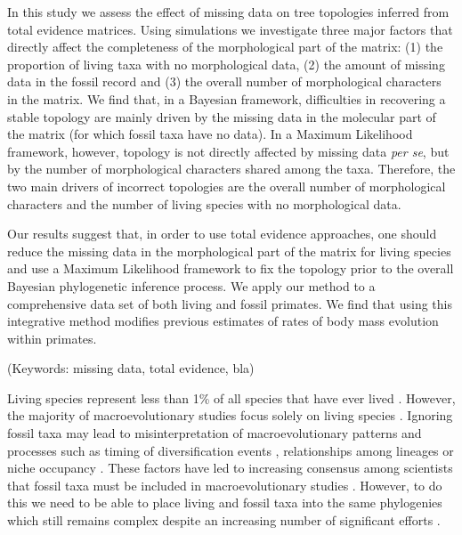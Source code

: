 \documentclass[12pt,letterpaper]{article}
\begin{document}
In this study we assess the effect of missing data on tree topologies inferred from total evidence matrices.
Using simulations we investigate three major factors that directly affect the completeness of the morphological part of the matrix:
(1) the proportion of living taxa with no morphological data,
(2) the amount of missing data in the fossil record and
(3) the overall number of morphological characters in the matrix.
We find that, in a Bayesian framework, difficulties in recovering a stable topology are mainly driven by the missing data in the molecular part of the matrix (for which fossil taxa have no data).
In a Maximum Likelihood framework, however, topology is not directly affected by missing data \textit{per se}, but by the number of morphological characters shared among the taxa.
Therefore, the two main drivers of incorrect topologies are the overall number of morphological characters and the number of living species with no morphological data.

Our results suggest that, in order to use total evidence approaches, one should reduce the missing data in the morphological part of the matrix for living species and use a Maximum Likelihood framework to fix the topology prior to the overall Bayesian phylogenetic inference process.
We apply our method to a comprehensive data set of both living and fossil primates. %
We find that using this integrative method modifies previous estimates of rates of body mass evolution within primates.

\noindent (Keywords: missing data, total evidence, bla)\\

\vspace{1.5in}

\newpage 


%
%


Living species represent less than 1\% of all species that have ever lived \citep{novacek1992ext,raup1993extinction}.
However, the majority of macroevolutionary studies focus solely on living species \citep{cooperwhat2009,meredithimpacts2011,healyecology2014}. %
Ignoring fossil taxa may lead to misinterpretation of macroevolutionary patterns and processes such as timing of diversification events \citep[e.g.][]{pyrondivergence2011}, relationships among lineages \citep[e.g.][]{manosphylogeny2007} or niche occupancy \citep[e.g.][]{pearmanniche2008}.
These factors have led to increasing consensus among scientists that fossil taxa must be included in macroevolutionary studies \citep{jacksonwhat2006,quentaldiversity2010,dietlconservation2011,slaterunifying2013,fritzdiversity2013}.
However, to do this we need to be able to place living and fossil taxa into the same phylogenies which still remains complex despite an increasing number of significant efforts \citep{pyrondivergence2011,ronquista2012,schragocombining2013}. %
\end{document}
